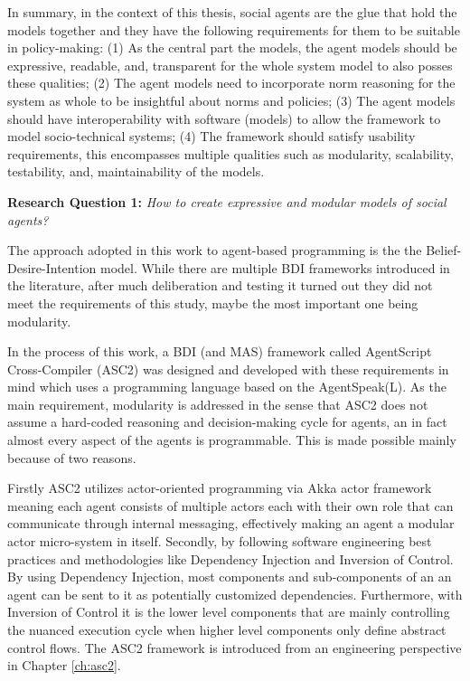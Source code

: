 In summary, in the context of this thesis, social agents are the glue that hold the models together and they have the following requirements for them to be suitable in policy-making: (1) As the central part the models, the agent models should be expressive, readable, and, transparent for the whole system model to also posses these qualities; (2) The agent models need to incorporate norm reasoning for the system as whole to be insightful about norms and policies; (3) The agent models should have interoperability with software (models) to allow the framework to model socio-technical systems; (4) The framework should satisfy usability requirements, this encompasses multiple qualities such as modularity, scalability, testability, and, maintainability of the models.

\begin{displayquote}
\textbf{Research Question 1:} \textit{How to create expressive and modular models of social agents?}
\end{displayquote}




The approach adopted in this work to agent-based programming is the the Belief-Desire-Intention model. While there are multiple BDI frameworks introduced in the literature, after much deliberation and testing it turned out they did not meet the requirements of this study, maybe the most important one being modularity.

In the process of this work, a BDI (and MAS) framework called AgentScript Cross-Compiler (ASC2) was designed and developed with these requirements in mind which uses a programming language based on the AgentSpeak(L). As the main requirement, modularity is addressed in the sense that ASC2 does not assume a hard-coded reasoning and decision-making cycle for agents, an in fact almost every aspect of the agents is programmable. This is made possible mainly because of two reasons. 

Firstly ASC2 utilizes actor-oriented programming via Akka actor framework meaning each agent consists of multiple actors each with their own role that can communicate through internal messaging, effectively making an agent a modular actor micro-system in itself. Secondly, by following software engineering best practices and methodologies like Dependency Injection and Inversion of Control. By using Dependency Injection, most components and sub-components of an an agent can be sent to it as potentially customized dependencies. Furthermore, with Inversion of Control it is the lower level components that are mainly controlling the nuanced execution cycle when higher level components only define abstract control flows. The ASC2 framework is introduced from an engineering perspective in Chapter \ref{ch:asc2}. 

